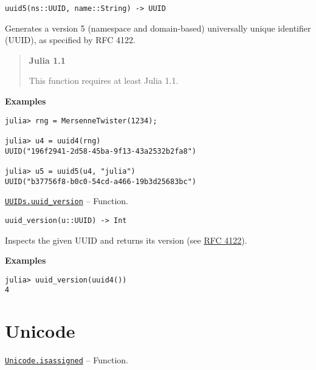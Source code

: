 \begin{adjustwidth}{2em}{0pt}


\begin{verbatim}
uuid5(ns::UUID, name::String) -> UUID
\end{verbatim}

Generates a version 5 (namespace and domain-based) universally unique identifier (UUID), as specified by RFC 4122.

\begin{quote}
\textbf{Julia 1.1}

This function requires at least Julia 1.1.

\end{quote}
\textbf{Examples}


\begin{verbatim}
julia> rng = MersenneTwister(1234);

julia> u4 = uuid4(rng)
UUID("196f2941-2d58-45ba-9f13-43a2532b2fa8")

julia> u5 = uuid5(u4, "julia")
UUID("b37756f8-b0c0-54cd-a466-19b3d25683bc")
\end{verbatim}



\end{adjustwidth}
\hypertarget{2328416264059500569}{} 
\hyperlink{2328416264059500569}{\texttt{UUIDs.uuid\_version}}  -- {Function.}

\begin{adjustwidth}{2em}{0pt}


\begin{verbatim}
uuid_version(u::UUID) -> Int
\end{verbatim}

Inspects the given UUID and returns its version (see \href{https://www.ietf.org/rfc/rfc4122}{RFC 4122}).

\textbf{Examples}


\begin{verbatim}
julia> uuid_version(uuid4())
4
\end{verbatim}



\end{adjustwidth}

\hypertarget{1111253146082274876}{}


\chapter{Unicode}


\hypertarget{3408928680045716107}{} 
\hyperlink{3408928680045716107}{\texttt{Unicode.isassigned}}  -- {Function.}

